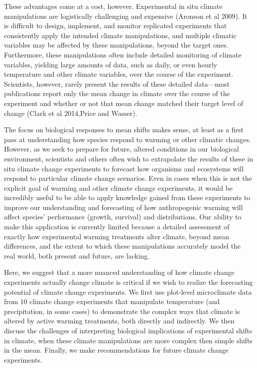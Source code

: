 \documentclass{article}
\begin{document}
\par These advantages come at a cost, however. Experimental in situ climate manipulations are logistically challenging and expensive (Aronson et al 2009). It is difficult to design, implement, and monitor replicated experiments that consistently apply the intended climate manipulations, and multiple climatic variables may be affected by these manipulations, beyond the target ones. 
Furthermore, these manipulations often include detailed monitoring of climate variables, yielding large amounts of data, such as daily, or even hourly temperature and other climate variables, over the course of the experiment. Scientists, however, rarely present the results of these detailed data---most publications report only the mean change in climate over the course of the experiment and whether or not that mean change matched their target level of change (Clark et al 2014,Price and Wasser). 
\par The focus on biological responses to mean shifts makes sense, at least as a first pass at understanding how species respond to warming or other climatic changes. However, as we seek to prepare for future, altered conditions in our biological environment, scientists and others often wish to extrapolate the results of these in situ climate change experiments to forecast how organisms and ecosystems will respond to particular climate change scenarios. 
Even in cases when this is not the explicit goal of warming and other climate change experiments, it would be incredibly useful to be able to apply knowledge gained from these experiments to improve our understanding and forecasting of how anthropogenic warming will affect species' performance (growth, survival) and distributions. Our ability to make this application is currently limited because a detailed assessment of exactly how experimental warming treatments alter climate, beyond mean differences, and the extent to which these manipulations accurately model the real world, both present and future, are lacking. 
\par Here, we suggest that a more nuanced understanding of how climate change experiments actually change climate is critical if we wish to realize the forecasting potential of climate change experiments. We first use plot-level microclimate data from 10 climate change experiments that manipulate temperature (and precipitation, in some cases) to demonstrate the complex ways that climate is altered by active warming treatments, both directly and indirectly. We then discuss the challenges of interpreting biological implications of experimental shifts in climate, when these climate manipulations are more complex then simple shifts in the mean. Finally, we make recommendations for future climate change experiments.
\end{document}
